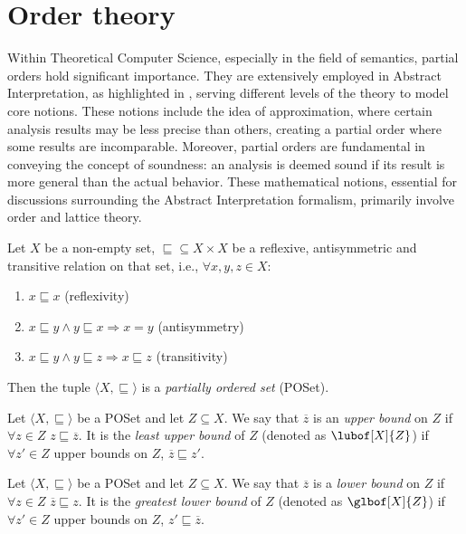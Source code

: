 \section{Order theory}

Within Theoretical Computer Science, especially in the field of
semantics, partial orders hold significant importance. They are
extensively employed in Abstract Interpretation, as highlighted in
\cite{mine:course}, serving different levels of the theory to model
core notions. These notions include the idea of approximation, where
certain analysis results may be less precise than others, creating a
partial order where some results are incomparable. Moreover, partial
orders are fundamental in conveying the concept of soundness: an
analysis is deemed sound if its result is more general than the actual
behavior. These mathematical notions, essential for discussions
surrounding the Abstract Interpretation formalism, primarily involve
order and lattice theory.

\begin{definition}
  Let \(X\) be a non-empty set, \(\sqsubseteq \subseteq X \times X\)
  be a reflexive, antisymmetric and transitive relation on that set,
  i.e., \(\forall x,y,z \in X\):

  \begin{enumerate}
  \item \(x \sqsubseteq x\) (reflexivity)
  \item \(x \sqsubseteq y \wedge y \sqsubseteq x \Rightarrow x = y\)
    (antisymmetry)
  \item \(x \sqsubseteq y \wedge y \sqsubseteq z \Rightarrow x
    \sqsubseteq z\) (transitivity)
  \end{enumerate}

  Then the tuple \(\langle X, \sqsubseteq\rangle\) is a
  \emph{partially ordered set} (POSet).
\end{definition}

\begin{definition}
  Let \(\langle X, \sqsubseteq \rangle\) be a POSet and let \(Z
  \subseteq X\). We say that \(\overline{z}\) is an \emph{upper bound}
  on \(Z\) if \(\forall z \in Z\) \(z \sqsubseteq \overline{z}\). It
  is the \emph{least upper bound} of \(Z\) (denoted as
  \(\lubof[X]{Z}\)) if \(\forall z' \in Z\) upper bounds on \(Z\),
  \(\overline{z} \sqsubseteq z'\).
\end{definition}

\begin{definition}
  Let \(\langle X, \sqsubseteq \rangle\) be a POSet and let \(Z
  \subseteq X\). We say that \(\overline{z}\) is a \emph{lower bound}
  on \(Z\) if \(\forall z \in Z\) \(\overline{z} \sqsubseteq z\). It
  is the \emph{greatest lower bound} of \(Z\) (denoted as
  \(\glbof[X]{Z}\)) if \(\forall z' \in Z\) upper bounds on \(Z\), \(z'
  \sqsubseteq \overline{z}\).
\end{definition}

